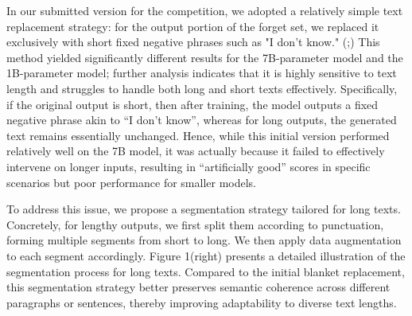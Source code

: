 \documentclass[11pt]{article}
\begin{document}
In our submitted version for the competition, we adopted a relatively simple text replacement strategy: for the output portion of the forget set, we replaced it exclusively with short fixed negative phrases such as "I don’t know." (\citet{choi2024snap};\citet{shi2024ulmr}) 
This method yielded significantly different results for the 7B-parameter model and the 1B-parameter model; further analysis indicates that it is highly sensitive to text length and struggles to handle both long and short texts effectively. 
Specifically, if the original output is short, then after training, the model outputs a fixed negative phrase akin to “I don’t know”, whereas for long outputs, the generated text remains essentially unchanged. 
Hence, while this initial version performed relatively well on the 7B model, it was actually because it failed to effectively intervene on longer inputs, resulting in “artificially good” scores in specific scenarios but poor performance for smaller models.

To address this issue, we propose a segmentation strategy tailored for long texts. 
Concretely, for lengthy outputs, we first split them according to punctuation, forming multiple segments from short to long. 
We then apply data augmentation to each segment accordingly. 
Figure 1(right) presents a detailed illustration of the segmentation process for long texts. 
Compared to the initial blanket replacement, this segmentation strategy better preserves semantic coherence across different paragraphs or sentences, thereby improving adaptability to diverse text lengths.
\end{document}
